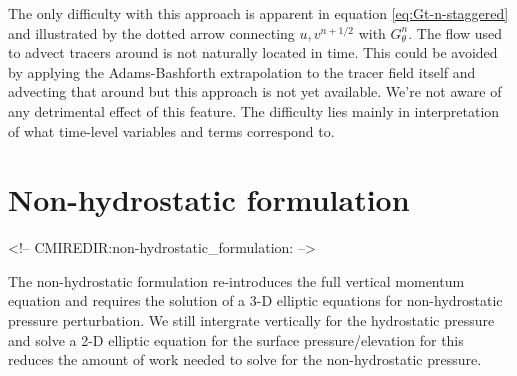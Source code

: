 The only difficulty with this approach is apparent in equation
\ref{eq:Gt-n-staggered} and illustrated by the dotted arrow
connecting $u,v^{n+1/2}$ with $G_\theta^{n}$. The flow used to advect
tracers around is not naturally located in time. This could be avoided
by applying the Adams-Bashforth extrapolation to the tracer field
itself and advecting that around but this approach is not yet
available. We're not aware of any detrimental effect of this
feature. The difficulty lies mainly in interpretation of what
time-level variables and terms correspond to.


\section{Non-hydrostatic formulation}
\label{sect:non-hydrostatic}
\begin{rawhtml}
<!-- CMIREDIR:non-hydrostatic_formulation: -->
\end{rawhtml}

The non-hydrostatic formulation re-introduces the full vertical
momentum equation and requires the solution of a 3-D elliptic
equations for non-hydrostatic pressure perturbation. We still
intergrate vertically for the hydrostatic pressure and solve a 2-D
elliptic equation for the surface pressure/elevation for this reduces
the amount of work needed to solve for the non-hydrostatic pressure.

